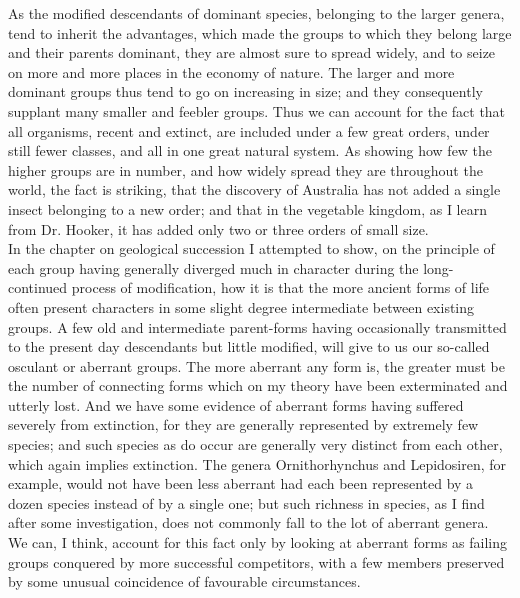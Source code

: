 \indent As the modified descendants of dominant species, belonging to the larger genera, tend to inherit the advantages, which made the groups to which they belong large and their parents dominant, they are almost sure to spread widely, and to seize on more and more places in the economy of nature. The larger and more dominant groups thus tend to go on increasing in size; and they consequently supplant many smaller and feebler groups. Thus we can account for the fact that all organisms, recent and extinct, are included under a few great orders, under still fewer classes, and all in one great natural system. As showing how few the higher groups are in number, and how widely spread they are throughout the world, the fact is striking, that the discovery of Australia has not added a single insect belonging to a new order; and that in the vegetable kingdom, as I learn from Dr. Hooker, it has added only two or three orders of small size.~\\
\indent In the chapter on geological succession I attempted to show, on the principle of each group having generally diverged much in character during the long-continued process of modification, how it is that the more ancient forms of life often present characters in some slight degree intermediate between existing groups. A few old and intermediate parent-forms having occasionally transmitted to the present day descendants but little modified, will give to us our so-called osculant or aberrant groups. The more aberrant any form is, the greater must be the number of connecting forms which on my theory have been exterminated and utterly lost. And we have some evidence of aberrant forms having suffered severely from extinction, for they are generally represented by extremely few species; and such species as do occur are generally very distinct from each other, which again implies extinction. The genera Ornithorhynchus and Lepidosiren, for example, would not have been less aberrant had each been represented by a dozen species instead of by a single one; but such richness in species, as I find after some investigation, does not commonly fall to the lot of aberrant genera. We can, I think, account for this fact only by looking at aberrant forms as failing groups conquered by more successful competitors, with a few members preserved by some unusual coincidence of favourable circumstances.~\\
